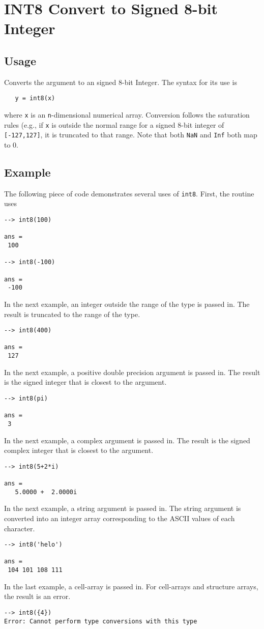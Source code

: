 \section{INT8 Convert to Signed 8-bit Integer}

\subsection{Usage}

Converts the argument to an signed 8-bit Integer.  The syntax
for its use is
\begin{verbatim}
   y = int8(x)
\end{verbatim}
where \verb|x| is an \verb|n|-dimensional numerical array.  Conversion
follows the saturation rules (e.g., if \verb|x| is outside the normal
range for a signed 8-bit integer of \verb|[-127,127]|, it is truncated to that
range.  Note that
both \verb|NaN| and \verb|Inf| both map to 0.
\subsection{Example}

The following piece of code demonstrates several uses of \verb|int8|.  First, the routine uses
\begin{verbatim}
--> int8(100)

ans = 
 100 

--> int8(-100)

ans = 
 -100 
\end{verbatim}
In the next example, an integer outside the range  of the type is passed in.  
The result is truncated to the range of the type.
\begin{verbatim}
--> int8(400)

ans = 
 127 
\end{verbatim}
In the next example, a positive double precision argument is passed in.  
The result is the signed integer that is closest to the argument.
\begin{verbatim}
--> int8(pi)

ans = 
 3 
\end{verbatim}
In the next example, a complex argument is passed in.  The result is the 
signed complex integer that is closest to the argument.
\begin{verbatim}
--> int8(5+2*i)

ans = 
   5.0000 +  2.0000i 
\end{verbatim}
In the next example, a string argument is passed in.  The string argument 
is converted into an integer array corresponding to the ASCII values of each character.
\begin{verbatim}
--> int8('helo')

ans = 
 104 101 108 111 
\end{verbatim}
In the last example, a cell-array is passed in.  For cell-arrays and 
structure arrays, the result is an error.
\begin{verbatim}
--> int8({4})
Error: Cannot perform type conversions with this type
\end{verbatim}
